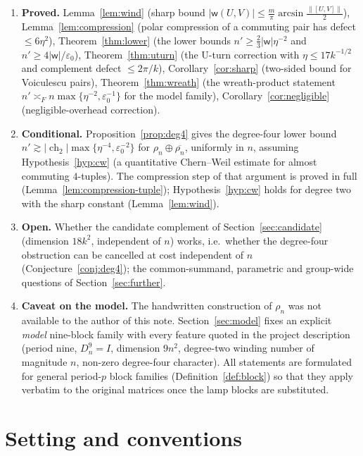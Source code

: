 \documentclass[11pt]{amsart}
\theoremstyle{definition}
\theoremstyle{remark}
\newcommand{\ch}{\operatorname{ch}}
\newcommand{\wind}{\mathsf w}
\newcommand{\norm}[1]{\lVert #1\rVert}
\begin{document}
\begin{enumerate}[leftmargin=2em]
\item \textbf{Proved.} Lemma~\ref{lem:wind} (sharp bound $|\wind(U,V)|\le \frac m\pi\arcsin\frac{\norm{[U,V]}}2$), Lemma~\ref{lem:compression} (polar compression of a commuting pair has defect $\le 6\eta^2$), Theorem~\ref{thm:lower} (the lower bounds $n'\ge\frac23|\wind|\eta^{-2}$ and $n'\ge 4|\wind|/\varepsilon_0$), Theorem~\ref{thm:uturn} (the U-turn correction with $\eta\le 17k^{-1/2}$ and complement defect $\le 2\pi/k$), Corollary~\ref{cor:sharp} (two-sided bound for Voiculescu pairs), Theorem~\ref{thm:wreath} (the wreath-product statement $n'\asymp_F n\max\{\eta^{-2},\varepsilon_0^{-1}\}$ for the model family), Corollary~\ref{cor:negligible} (negligible-overhead correction).
\item \textbf{Conditional.} Proposition~\ref{prop:deg4} gives the degree-four lower bound $n'\gtrsim|\ch_2|\max\{\eta^{-4},\varepsilon_0^{-2}\}$ for $\rho_n\oplus\overline{\rho_n}$, uniformly in $n$, assuming Hypothesis~\ref{hyp:cw} (a quantitative Chern--Weil estimate for almost commuting $4$-tuples). The compression step of that argument is proved in full (Lemma~\ref{lem:compression-tuple}); Hypothesis~\ref{hyp:cw} holds for degree two with the sharp constant (Lemma~\ref{lem:wind}).
\item \textbf{Open.} Whether the candidate complement of Section~\ref{sec:candidate} (dimension $18k^2$, independent of $n$) works, i.e.\ whether the degree-four obstruction can be cancelled at cost independent of $n$ (Conjecture~\ref{conj:deg4}); the common-summand, parametric and group-wide questions of Section~\ref{sec:further}.
\item \textbf{Caveat on the model.} The handwritten construction of $\rho_n$ was not available to the author of this note. Section~\ref{sec:model} fixes an explicit \emph{model} nine-block family with every feature quoted in the project description (period nine, $D_n^9=I$, dimension $9n^2$, degree-two winding number of magnitude $n$, non-zero degree-four character). All statements are formulated for general period-$p$ block families (Definition~\ref{def:block}) so that they apply verbatim to the original matrices once the lamp blocks are substituted.
\end{enumerate}

\section{Setting and conventions}\label{sec:setting}
\end{document}
